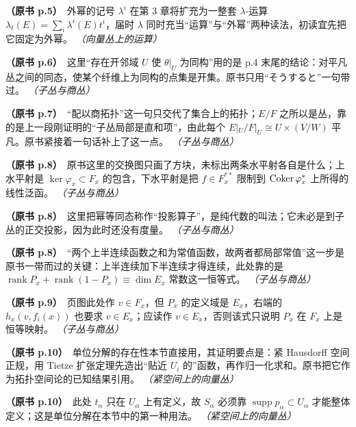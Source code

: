 \noindent \textbf{（原书 p.5）}\ 外幂的记号 $\lambda^i$ 在第 3 章将扩充为一整套 $\lambda$-运算 $\lambda_t(E)=\sum_i\lambda^i(E)t^i$，届时 $\lambda$ 同时充当“运算”与“外幂”两种读法，初读宜先把它固定为外幂。 \textit{（向量丛上的运算）}\par\smallskip

\noindent \textbf{（原书 p.6）}\ 这里“存在开邻域 $U$ 使 $\theta|_U$ 为同构”用的是 p.4 末尾的结论：对平凡丛之间的同态，使某个纤维上为同构的点集是开集。原书只用“そうすると”一句带过。 \textit{（子丛与商丛）}\par\smallskip

\noindent \textbf{（原书 p.7）}\ “配以商拓扑”这一句只交代了集合上的拓扑；$E/F$ 之所以是丛，靠的是上一段刚证明的“子丛局部是直和项”，由此每个 $E|_U/F|_U\cong U\times(V/W)$ 平凡。原书紧接着一句话补上了这一点。 \textit{（子丛与商丛）}\par\smallskip

\noindent \textbf{（原书 p.8）}\ 原书这里的交换图只画了方块，未标出两条水平射各自是什么；上水平射是 $\ker\varphi_x\subset F_x$ 的包含，下水平射是把 $f\in F_x^{**}$ 限制到 $\operatorname{Coker}\varphi_x^*$ 上所得的线性泛函。 \textit{（子丛与商丛）}\par\smallskip

\noindent \textbf{（原书 p.8）}\ 这里把幂等同态称作“投影算子”，是纯代数的叫法；它未必是到子丛的正交投影，因为此时还没有度量。 \textit{（子丛与商丛）}\par\smallskip

\noindent \textbf{（原书 p.8）}\ “两个上半连续函数之和为常值函数，故两者都局部常值”这一步是原书一带而过的关键：上半连续加下半连续才得连续，此处靠的是 $\operatorname{rank}P_x+\operatorname{rank}(1-P_x)\equiv\dim E_x$ 常数这一恒等式。 \textit{（子丛与商丛）}\par\smallskip

\noindent \textbf{（原书 p.9）}\ 页图此处作 $v\in F_x$，但 $P_x$ 的定义域是 $E_x$，右端的 $h_x(v,f_i(x))$ 也要求 $v\in E_x$；应读作 $v\in E_x$，否则该式只说明 $P_x$ 在 $F_x$ 上是恒等映射。 \textit{（子丛与商丛）}\par\smallskip

\noindent \textbf{（原书 p.10）}\ 单位分解的存在性本节直接用，其证明要点是：紧 Hausdorff 空间正规，用 Tietze 扩张定理先造出“贴近 $U_i$ 的”函数，再作归一化求和。原书把它作为拓扑空间论的已知结果引用。 \textit{（紧空间上的向量丛）}\par\smallskip

\noindent \textbf{（原书 p.10）}\ 此处 $t_\alpha$ 只在 $U_\alpha$ 上有定义，故 $S_\alpha$ 必须靠 $\operatorname{supp}p_\alpha\subset U_\alpha$ 才能整体定义；这是单位分解在本节中的第一种用法。 \textit{（紧空间上的向量丛）}\par\smallskip

